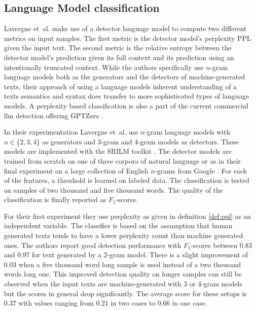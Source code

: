     \subsection{Language Model classification}
    Lavergne et~al. \cite{lavergne2008detecting} make use of a detector language model to compute two different metrics on input samples.
    The first metric is the detector model's perplexity PPL given the input text.
    The second metric is the relative entropy between the detector model's prediction given its full context and its prediction using an intentionally truncated context.
    While the authors specifically use $n$-gram language models both as the generators and the detectors of machine-generated texts,
    their approach of using a language models inherent understanding of a texts semantics and syntax does transfer to more sophisticated types of language models.
    A perplexity based classification is also a part of the current commercial \ac{llm} detection offering GPTZero \cite{tian2023inside}. 
      
    In their experimentation Lavergne et~al. \cite{lavergne2008detecting} use $n$-gram language models with $n \in \{2,3,4\}$ as generators and $3$-gram and $4$-gram models as detectors.
    These models are implemented with the SRILM toolkit \cite{stolcke2002srilm}.
    The detector models are trained from scratch on one of three corpora of natural language or as in their final experiment on a large collection of English $n$-grams from Google \cite{brants2006web}. 
    For each of the features, a threshold is learned on labeled data.
    The classification is tested on samples of two thousand and five thousand words.
    The quality of the classification is finally reported as $F_1$-scores.
    
    For their first experiment they use perplexity as given in definition \ref{def:ppl} as an independent variable.
    The classifier is based on the assumption that human generated texts tends to have a lower perplexity count than machine generated ones.
    The authors report good detection performance with $F_1$-scores between $0.83$ and $0.97$ for text generated by a $2$-gram model.
    There is a slight improvement of $0.03$ when a five thousand word long sample is used instead of a two thousand words long one.
    This improved detection quality on longer samples can still be observed when the input texts are machine-generated with $3$ or $4$-gram models but the scores in general drop significantly.
    The average score for these setups is $0.37$ with values ranging from $0.21$ in two cases to $0.66$ in one case.


